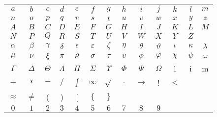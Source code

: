 \documentclass[20pt]{extreport}
\begin{document}
\begin{center}
	\begin{tabular}{ c c c c c c c c c c c c c }
		\( a \) & \( b \) & \( c \) & \( d \) & \( e \) & \( f \) & \( g \) & \( h \) & \( i \) & \( j \) & \( k \) & \( l \) & \( m \) \\ 
		\( n \) & \( o \) & \( p \) & \( q \) & \( r \) & \( s \) & \( t \) & \( u \) & \( v \) & \( w \) & \( x \) & \( y \) & \( z \)\\  

		\( A \) & \( B \) & \( C \) & \( D \) & \( E \) & \( F \) & \( G \) & \( H \) & \( I \) & \( J \) & \( K \) & \( L \) & \( M \)\\ 

		\( N \) & \( P \) & \( Q \) & \( R \) & \( S \) & \( T \) & \( U \) & \( V \) & \( W \) & \( X \) & \( Y \) & \( Z \)\\ 

		\(\alpha\) & \( \beta \) & \( \gamma \) & \( \delta \) & \( \epsilon \) & \(\varepsilon \) & \( \zeta \) & \( \eta \) & \( \theta \) & \(\vartheta\) & \( \iota \) & \( \kappa \) & \( \lambda \)\\
		
		\( \mu\) & \(\nu \) & \(\xi\) & \(\pi\) & \(\rho\) & \(\sigma \) & \(\tau \) & \(\upsilon \) & \(\phi \) & \(\varphi\)& \(\chi \) & \(\psi \) & \(\omega \) \\
		
		\(\Gamma \) & \(\Delta \) & \(\Theta\) & \(\Lambda\) & \(\Pi\) & \(\Sigma\) & \(\Upsilon\) & \(\Phi\) & \(\Psi\) & \(\Omega\) & l & i & m \\
		
		\(+\) & \(*\) & \(-\) & \( / \) & \(\int \) & \(\infty \) & \(\sqrt{} \) & \(.\) & \(\rightarrow \) & ! & \(<\)  \\
		
		\(\approx \) & \(\neq \) & ( & ) & [ & \(\{ \) & \( \} \)\\
		
		\( 0 \) & \( 1 \) & \( 2 \) & \( 3 \) & \( 4 \) & \( 5 \) & \( 6 \) & \( 7 \) & \( 8 \) & \( 9 \)\\
	\end{tabular}
\end{center}
\end{document}
